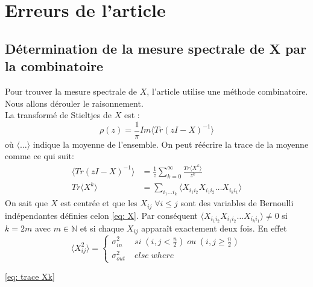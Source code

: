 \section{Erreurs de l'article}
\subsection{Détermination de la mesure spectrale de X par la combinatoire}
Pour trouver la mesure spectrale de $X$, l'article utilise une méthode combinatoire.
Nous allons dérouler le raisonnement.\\
La transformé de Stieltjes de $X$ est :
\begin{equation}
	\rho(z) = \frac{1}{\pi} Im\langle Tr(zI - X)^{-1}\rangle
\end{equation}
où $\langle \dots \rangle$ indique la moyenne de l'ensemble.
On peut réécrire la trace de la moyenne comme ce qui suit: 
\begin{align}
	\langle Tr(zI - X)^{-1}\rangle &= \frac{1}{z}\sum_{k=0}^{\infty} \frac{Tr\langle X^k\rangle}{z^k} \\
	Tr\langle X^k\rangle &= \sum_{i_1\dots i_k}\langle X_{i_1i_2}X_{i_1i_2}\dots X_{i_ki_1}\rangle \label{eq: trace Xk}
\end{align}
On sait que $X$ est centrée et que les $X_{ij} \; \forall i\leq j$ sont des variables de Bernoulli indépendantes définies celon \eqref{eq: X}.
Par conséquent $\langle X_{i_1i_2}X_{i_1i_2}\dots X_{i_ki_1}\rangle \neq 0$ si $k = 2m$ avec $m\in \mathbb{N}$ et si chaque $X_{ij}$ apparaît exactement deux fois.
En effet
\begin{equation}
	\langle X_{ij}^2\rangle = \left\{
	\begin{array}{lr}
		\sigma_{in}^2  &\; si \; (i,j < \frac{n}{2}) \; ou \; (i,j \ge \frac{n}{2}) \\
		\sigma_{out}^2 &\; else \; where
	\end{array}
\right.\nonumber
\end{equation}

\eqref{eq: trace Xk}


